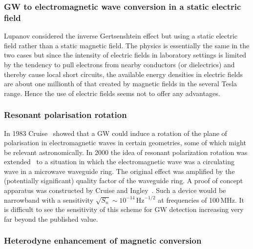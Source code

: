 \documentclass[11pt,a4paper]{article}
\begin{document}
\subsubsection{GW to electromagnetic wave conversion in a static electric field}
\label{sec:ConversionEfield}

Lupanov \cite{Lupanov} considered the inverse Gertsenshtein effect but using a static electric field rather than a static magnetic field. The physics is essentially the same in the two cases but since the intensity of electric fields in laboratory settings is limited by the tendency to pull electrons from nearby conductors (or dielectrics) and thereby cause local short circuits, the available energy densities in electric fields are about one millionth of that created by magnetic fields in the several Tesla range. Hence the use of electric fields seems not to offer any advantages.

\subsubsection{Resonant polarisation rotation}
\label{sec:ResonantPolarisationRotation}

In 1983 Cruise~\cite{Cruise1} showed that a GW could induce a rotation of the plane of polarisation in electromagnetic waves in certain geometries, some of which might be relevant astronomically. In 2000 the idea of resonant polarization rotation was extended~\cite{Cruise2} to a situation in which the electromagnetic wave was a circulating wave in a microwave waveguide ring. The original effect was amplified by the (potentially significant) quality factor of the waveguide ring. A proof of concept apparatus was constructed by Cruise and Ingley~\cite{Cruise3, Cruise:2006zt}. Such a device would be narrowband with a sensitivity $\sqrt{S_n} \sim 10^{-14}\,\text{Hz}^{-1/2}$ at frequencies of 100\,MHz. It is difficult to see the sensitivity of this scheme for GW detection increasing very far beyond the published value.

\subsubsection{Heterodyne enhancement of magnetic conversion}
\label{sec:AmplificationMethods}
\end{document}
